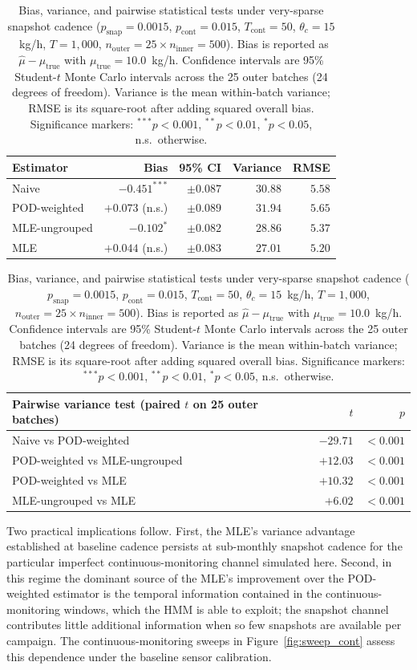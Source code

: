 \documentclass[11pt]{article}
\newcommand{\new}[1]{#1}
\begin{document}
\begin{table}[h]
\centering
\caption{\new{Bias, variance, and pairwise statistical tests under
very-sparse snapshot cadence ($p_{\text{snap}} = 0.0015$,
$p_{\text{cont}} = 0.015$, $T_{\text{cont}} = 50$, $\theta_c = 15$~kg/h,
$T = 1{,}000$, $n_{\text{outer}} = 25 \times n_{\text{inner}} = 500$).
Bias is reported as $\hat\mu - \mu_{\text{true}}$ with
$\mu_{\text{true}} = 10.0$~kg/h. Confidence intervals are 95\% Student-$t$ Monte Carlo intervals across the 25 outer batches (24 degrees of freedom). Variance is the mean within-batch variance; RMSE is its square-root after adding squared overall bias. Significance markers: $^{***}\!p<0.001$,
$^{**}\!p<0.01$, $^{*}\!p<0.05$, n.s.\ otherwise.}}
\label{tab:sparse_comparison}
\begin{tabular}{lrrrr}
\toprule
Estimator         & Bias              & 95\% CI    & Variance        & RMSE \\
\midrule
Naive & $-0.451^{***}$ & $\pm 0.087$ & $30.88$ & $5.58$ \\
POD-weighted & $+0.073$ (n.s.) & $\pm 0.089$ & $31.94$ & $5.65$ \\
MLE-ungrouped & $-0.102^{*}$ & $\pm 0.082$ & $28.86$ & $5.37$ \\
MLE & $+0.044$ (n.s.) & $\pm 0.083$ & $27.01$ & $5.20$ \\
\bottomrule
\end{tabular}

\vspace{0.6em}

\begin{tabular}{lrr}
\toprule
Pairwise variance test (paired $t$ on 25 outer batches) & $t$ & $p$ \\
\midrule
Naive vs POD-weighted & $-29.71$ & $<0.001$ \\
POD-weighted vs MLE-ungrouped & $+12.03$ & $<0.001$ \\
POD-weighted vs MLE & $+10.32$ & $<0.001$ \\
MLE-ungrouped vs MLE & $+6.02$ & $<0.001$ \\
\bottomrule
\end{tabular}
\end{table}

\new{Two practical implications follow. First, the MLE's variance advantage
established at baseline cadence persists at sub-monthly snapshot cadence
for the particular imperfect continuous-monitoring channel simulated here.
Second, in this regime the dominant source of the MLE's improvement
over the POD-weighted estimator is the temporal information contained
in the continuous-monitoring windows, which the HMM is able to exploit;
the snapshot channel contributes little additional information when so
few snapshots are available per campaign. The continuous-monitoring sweeps in Figure~\ref{fig:sweep_cont} assess this dependence under the baseline sensor calibration.}
\end{document}
